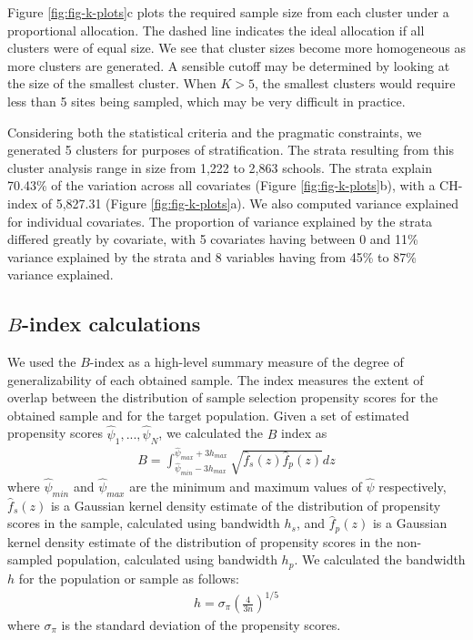 \documentclass[
  man,floatsintext]{apa6}
\begin{document}
Figure \ref{fig:fig-k-plots}c plots the required sample size from each cluster under a proportional allocation. The dashed line indicates the ideal allocation if all clusters were of equal size. We see that cluster sizes become more homogeneous as more clusters are generated. A sensible cutoff may be determined by looking at the size of the smallest cluster. When \(K > 5\), the smallest clusters would require less than 5 sites being sampled, which may be very difficult in practice.

Considering both the statistical criteria and the pragmatic constraints, we generated 5 clusters for purposes of stratification. The strata resulting from this cluster analysis range in size from 1,222 to 2,863 schools. The strata explain 70.43\% of the variation across all covariates (Figure \ref{fig:fig-k-plots}b), with a CH-index of 5,827.31 (Figure \ref{fig:fig-k-plots}a). We also computed variance explained for individual covariates. The proportion of variance explained by the strata differed greatly by covariate, with 5 covariates having between 0 and 11\% variance explained by the strata and 8 variables having from 45\% to 87\% variance explained.

\hypertarget{B-index}{%
\subsection{\texorpdfstring{\(B\)-index calculations}{B-index calculations}}\label{B-index}}

We used the \(B\)-index as a high-level summary measure of the degree of generalizability of each obtained sample. The index measures the extent of overlap between the distribution of sample selection propensity scores for the obtained sample and for the target population.
Given a set of estimated propensity scores \(\hat\psi_1,...,\hat\psi_N\), we calculated the \(B\) index as
\begin{align}
B = \int_{\hat\psi_{min}-3h_{max}}^{\hat\psi_{max}+3h_{max}}\sqrt{\hat{f}_s(z)\hat{f}_p(z)}dz
\end{align}
where \(\hat\psi_{min}\) and \(\hat\psi_{max}\) are the minimum and maximum values of \(\hat\psi\) respectively, \(\hat{f}_s(z)\) is a Gaussian kernel density estimate of the distribution of propensity scores in the sample, calculated using bandwidth \(h_s\), and \(\hat{f}_p(z)\) is a Gaussian kernel density estimate of the distribution of propensity scores in the non-sampled population, calculated using bandwidth \(h_p\). We calculated the bandwidth \(h\) for the population or sample as follows:
\begin{align}
h = \sigma_{\pi}\left(\frac{4}{3n}\right)^{1/5}
\end{align}
where \(\sigma_{\pi}\) is the standard deviation of the propensity scores.
\end{document}
